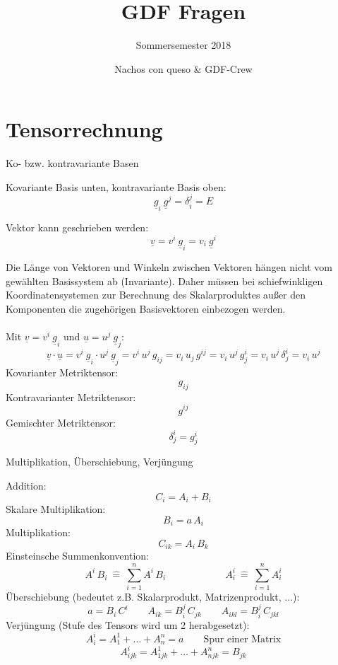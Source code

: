 \documentclass[twocolumn, fontsize=8pt, DIV=1]{scrartcl}
\title{GDF Fragen}
\subtitle{Sommersemester 2018}
\author{Nachos con queso \& GDF-Crew}
\date{}
\begin{document}
\maketitle







\section{Tensorrechnung}




\begin{framed}
    Ko- bzw. kontravariante Basen
\end{framed}
Kovariante Basis unten, kontravariante Basis oben:
\[ \underline{g}_{i}\ \underline{g}^{j} = \delta_i^j = E \]

Vektor kann geschrieben werden:
\[ 
 \underline{v} = v^i \ \underline{g}_i = v_i \ \underline{g}^i 
\]

Die Länge von Vektoren und Winkeln zwischen Vektoren hängen nicht vom gewählten Basissystem ab (Invariante). Daher müssen bei schiefwinkligen Koordinatensystemen zur Berechnung des Skalarproduktes außer den Komponenten die zugehörigen Basisvektoren einbezogen werden.\\
\ \\
Mit $\underline{v} = v^i \ \underline{g}_i$ und $\underline{u} = u^j\ \underline{g}_j$:
\[
\underline{v} \cdot \underline{u} = v^i \ \underline{g}_i \cdot u^j\ \underline{g}_j
= v^i\, u^j\, g_{ij}
= v_i\, u_j\, g^{ij}
= v_i\, u^j\, g^i_j
= v_i\, u^j\, \delta^i_j
= v_i\, u^j
\]
Kovarianter Metriktensor: \[g_{ij}\]
Kontravarianter Metriktensor: \[g^{ij}\]
Gemischter Metriktensor: \[\delta^i_j = g^i_j\]



\begin{framed}
    Multiplikation, Überschiebung, Verjüngung
\end{framed}
Addition:
\[
    C_i = A_i + B_i
\]
Skalare Multiplikation:
\[
    B_i = a\, A_i
\]
Multiplikation:
\[
    C_{ik} = A_i\, B_k
\]
Einsteinsche Summenkonvention:
\[
    A^i\, B_i\ \hat{=}\ \sum_{i=1}^n A^i\, B_i
    \qquad\qquad\qquad
    A^i_i\ \hat{=}\ \sum_{i=1}^n A^i_i
\]
Überschiebung (bedeutet z.B. Skalarprodukt, Matrizenprodukt, $\dots$):
\[
    a = B_i\, C^i
    \qquad
    A_{ik} = B_i^j\, C_{jk}
    \qquad
    A_{ikl} = B_i^j\, C_{jkl}
\]
Verjüngung (Stufe des Tensors wird um 2 herabgesetzt):
\[
    A^i_i = A^1_1 + \dots + A^n_n = a \qquad \text{Spur einer Matrix}
\]
\[
    A^i_{ijk} = A^1_{1jk} + \dots + A^n_{njk} = B_{jk}
\]
\end{document}
